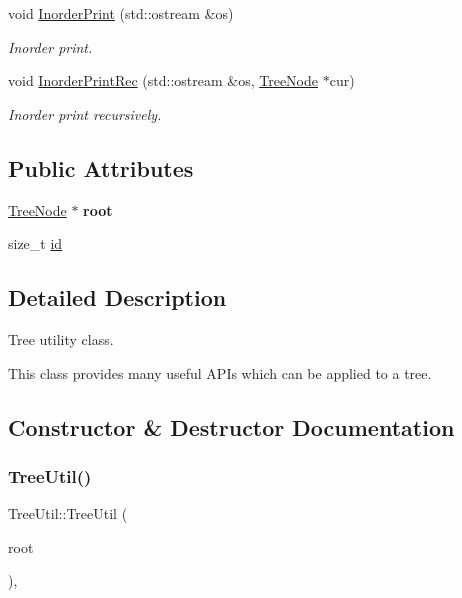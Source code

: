 \begin{DoxyCompactItemize}
void \hyperlink{classTreeUtil_ab7617a40a2b508602c5094667c318a4f}{Inorder\+Print} (std\+::ostream \&os)
\begin{DoxyCompactList}\small\item\em Inorder print. \end{DoxyCompactList}\item 
\mbox{\label{classTreeUtil_a0674a543776ed3c8de207f8e3d6a29a3}} 
void \hyperlink{classTreeUtil_a0674a543776ed3c8de207f8e3d6a29a3}{Inorder\+Print\+Rec} (std\+::ostream \&os, \hyperlink{structTreeNode}{Tree\+Node} $\ast$cur)
\begin{DoxyCompactList}\small\item\em Inorder print recursively. \end{DoxyCompactList}\end{DoxyCompactItemize}
\subsection*{Public Attributes}
\begin{DoxyCompactItemize}
\item 
\mbox{\label{classTreeUtil_abdfd330694b0f7f9d59a0400db7b05b4}} 
\hyperlink{structTreeNode}{Tree\+Node} $\ast$ {\bfseries root}
\item 
size\+\_\+t \hyperlink{classTreeUtil_a9b39a7cbe992826ad451627f87277804}{id}
\end{DoxyCompactItemize}


\subsection{Detailed Description}
Tree utility class. 

This class provides many useful A\+P\+Is which can be applied to a tree. 

\subsection{Constructor \& Destructor Documentation}
\mbox{\label{classTreeUtil_a5e1dfba5f1f3574c2cc73720d3569fe2}} 
\subsubsection{\texorpdfstring{Tree\+Util()}{TreeUtil()}}
{\footnotesize\ttfamily Tree\+Util\+::\+Tree\+Util (\begin{DoxyParamCaption}\item[{\hyperlink{structTreeNode}{Tree\+Node} $\ast$}]{root }\end{DoxyParamCaption})\hspace{0.3cm}{\ttfamily [inline]}, {\ttfamily [explicit]}}



